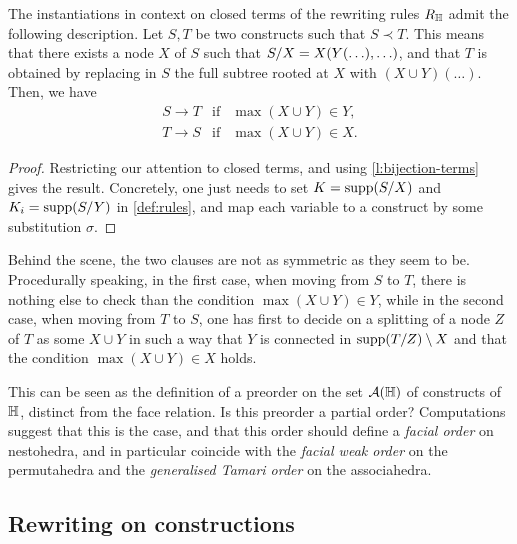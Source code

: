 \begin{lemma} 
  The instantiations in context on closed terms of the rewriting rules $R_{\mathbb H}$ admit the following description.
  Let $S,T$ be two constructs such that $S \prec T$. 
  This means that there exists a node $X$ of $S$ such that $S/X=X(Y(\ldots),\ldots)$, and that $T$ is obtained by replacing in $S$ the full subtree rooted at $X$ with $(X\cup Y)(\ldots)$. 
  Then, we have
  $$\begin{array}{lll}
    S \to T &  \mathrm{if} & \max(X\cup Y)\in Y, \\
    T \to S & \mathrm{if} & \max(X\cup Y)\in X.
  \end{array}$$
\end{lemma} 

\begin{proof}
  Restricting our attention to closed terms, and using \cref{l:bijection-terms} gives the result. 
  Concretely, one just needs to set $K=\operatorname{supp}(S/X)$ and $K_i=\operatorname{supp}(S/Y)$ in \cref{def:rules}, and map each variable to a construct by some substitution $\sigma$.
\end{proof}

Behind the scene, the two clauses are not as symmetric as they seem to be. 
Procedurally speaking, in the first case, when moving from $S$ to $T$, there is nothing else to check than the condition $\max(X\cup Y)\in Y$, while in the second case, when moving from $T$ to $S$, one has first to decide on a splitting of a node $Z$ of $T$ as some $X\cup Y$ in such a way that $Y$ is connected in $\operatorname{supp}(T/Z)\setminus X$ and  that  the condition $\max(X\cup Y)\in X$ holds.

\begin{rem}
  This can be seen as the definition of a preorder on the set $\mathcal{A}({\mathbb H})$ of constructs of ${\mathbb H}$, distinct from the face relation. 
  Is this preorder a partial order?
  Computations suggest that this is the case, and that this order should define a \emph{facial order} on nestohedra, and in particular coincide with the \emph{facial weak order} \cite{KrobLatapyNovelliPhanSchwer,PalaciosRonco,DermenjianHohlwegPilaud} on the permutahedra and the \emph{generalised Tamari order} \cite{Ronco-Tamari} on the associahedra.
\end{rem}


\subsection{Rewriting on constructions}
\label{ss:rewriting-constructions}

